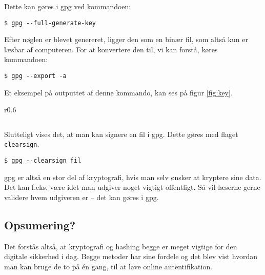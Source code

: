     Dette kan gøres i gpg ved kommandoen:
    \begin{verbatim}
$ gpg --full-generate-key
    \end{verbatim}


    Efter nøglen er blevet genereret, ligger den som en binær fil, som altså kun er læsbar af computeren.
    For at konvertere den til, vi kan forstå, køres kommandoen:
    \begin{verbatim}
$ gpg --export -a
    \end{verbatim}

    Et eksempel på outputtet af denne kommando, kan ses på figur \ref{fig:key}.\\

    \begin{wrapfigure}{r}{0.6\textwidth}
        \vspace{-30pt}
        \begin{center}
            \inputminted[python3, breaklines, fontsize=\scriptsize]{bash}{src/public.key}
            \vspace{-20pt}
            \caption{1024-bit nøgle genereret i gpg}
            \label{fig:key}
        \end{center}
        \vspace{-100pt}
    \end{wrapfigure}

    Slutteligt vises det, at man kan signere en fil i gpg.
    Dette gøres med flaget \texttt{clearsign}.
    \begin{verbatim}
$ gpg --clearsign fil
    \end{verbatim}

    gpg er altså en stor del af kryptografi, hvis man selv ønsker at kryptere sine data.
    Det kan f.eks. være idet man udgiver noget vigtigt offentligt.
    Så vil læserne gerne validere hvem udgiveren er -- det kan gøres i gpg.



\subsection{Opsumering?}
Det forstås altså, at kryptografi og hashing begge er meget vigtige for den digitale sikkerhed i dag.
Begge metoder har sine fordele og det blev vist hvordan man kan bruge de to på én gang, til at lave online autentifikation.
